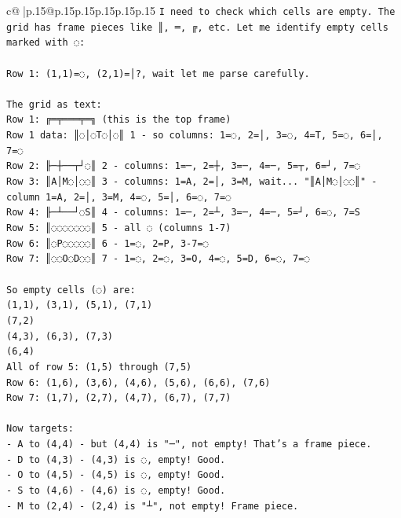 \documentclass{article}
\begin{document}
{\begin{supertabular}{c@{$\;$}|p{.15\linewidth}@{}p{.15\linewidth}p{.15\linewidth}p{.15\linewidth}p{.15\linewidth}p{.15\linewidth}}
{{{\texttt{I need to check which cells are empty. The grid has frame pieces like ║, ═, ╔, etc. Let me identify empty cells marked with ◌:} \\
\\ 
\texttt{Row 1: (1,1)=◌, (2,1)=│?, wait let me parse carefully.} \\
\\ 
\texttt{The grid as text:} \\
\texttt{Row 1: ╔═╤═══╤═╗ (this is the top frame)} \\
\texttt{Row 1 data: ║◌│◌T◌│◌║ 1 {-} so columns: 1=◌, 2=│, 3=◌, 4=T, 5=◌, 6=│, 7=◌} \\
\texttt{Row 2: ╟─┼──┬┘◌║ 2 {-} columns: 1=─, 2=┼, 3=─, 4=─, 5=┬, 6=┘, 7=◌} \\
\texttt{Row 3: ║A│M◌│◌◌║ 3 {-} columns: 1=A, 2=│, 3=M, wait... "║A│M◌│◌◌║" {-} column 1=A, 2=│, 3=M, 4=◌, 5=│, 6=◌, 7=◌} \\
\texttt{Row 4: ╟─┴──┘◌S║ 4 {-} columns: 1=─, 2=┴, 3=─, 4=─, 5=┘, 6=◌, 7=S} \\
\texttt{Row 5: ║◌◌◌◌◌◌◌║ 5 {-} all ◌ (columns 1{-}7)} \\
\texttt{Row 6: ║◌P◌◌◌◌◌║ 6 {-} 1=◌, 2=P, 3{-}7=◌} \\
\texttt{Row 7: ║◌◌O◌D◌◌║ 7 {-} 1=◌, 2=◌, 3=O, 4=◌, 5=D, 6=◌, 7=◌} \\
\\ 
\texttt{So empty cells (◌) are:} \\
\texttt{(1,1), (3,1), (5,1), (7,1)} \\
\texttt{(7,2)} \\
\texttt{(4,3), (6,3), (7,3)} \\
\texttt{(6,4)} \\
\texttt{All of row 5: (1,5) through (7,5)} \\
\texttt{Row 6: (1,6), (3,6), (4,6), (5,6), (6,6), (7,6)} \\
\texttt{Row 7: (1,7), (2,7), (4,7), (6,7), (7,7)} \\
\\ 
\texttt{Now targets:} \\
\texttt{{-} A to (4,4) {-} but (4,4) is "─", not empty! That's a frame piece.} \\
\texttt{{-} D to (4,3) {-} (4,3) is ◌, empty! Good.} \\
\texttt{{-} O to (4,5) {-} (4,5) is ◌, empty! Good.} \\
\texttt{{-} S to (4,6) {-} (4,6) is ◌, empty! Good.} \\
\texttt{{-} M to (2,4) {-} (2,4) is "┴", not empty! Frame piece.} \\
}}}
\end{supertabular}}
\end{document}
